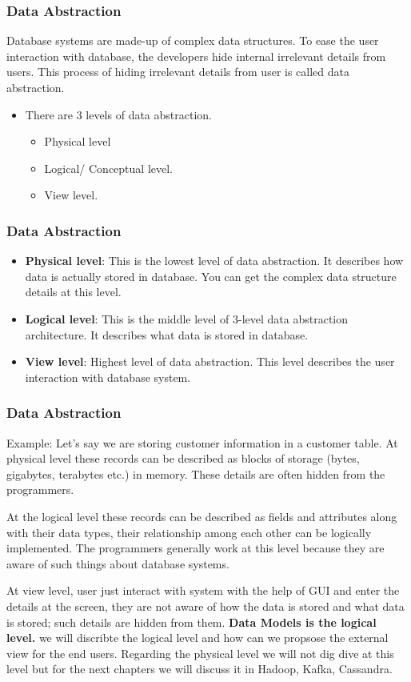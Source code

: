 \begin{frame}
	\frametitle{Data Abstraction}
	Database systems are made-up of complex data structures. To ease the user interaction with database, the developers hide internal irrelevant details from users. This process of hiding irrelevant details from user is called data abstraction.
	\begin{itemize}[<+->]
		\item There are 3 levels of data abstraction.
		\begin{itemize}[<+->]
			\item Physical level
			\item Logical/ Conceptual level.
			\item View level.
		\end{itemize}
	\end{itemize}		
\end{frame}
\begin{frame}
	\frametitle{Data Abstraction}
	\begin{itemize}[<+->]
		\item \textbf{Physical level}: This is the lowest level of data abstraction. It describes how data is actually stored in database. You can get the complex data structure details at this level.
		
		\item \textbf{Logical level}: This is the middle level of 3-level data abstraction architecture. It describes what data is stored in database.
		
		\item \textbf{View level}: Highest level of data abstraction. This level describes the user interaction with database system.
		
	\end{itemize}		
\end{frame}
\begin{frame}
	\frametitle{Data Abstraction}
	Example: Let’s say we are storing customer information in a customer table. At physical level these records can be described as blocks of storage (bytes, gigabytes, terabytes etc.) in memory. These details are often hidden from the programmers.
	
	At the logical level these records can be described as fields and attributes along with their data types, their relationship among each other can be logically implemented. The programmers generally work at this level because they are aware of such things about database systems.
	
	At view level, user just interact with system with the help of GUI and enter the details at the screen, they are not aware of how the data is stored and what data is stored; such details are hidden from them.
\textbf{	Data Models is the logical level.}
we will discribte the logical level and how can we propsose the external view for the end users.
Regarding the physical level we will not dig dive at this level but for the next chapters we will discuss it in Hadoop, Kafka, Cassandra.
\end{frame}
